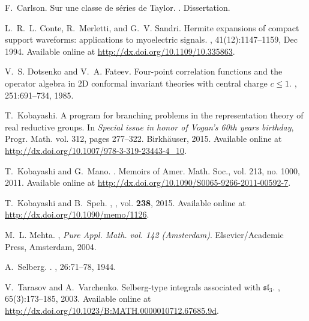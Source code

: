 \begin{thebibliography}{CMS94}

F.~Carlson.
\newblock Sur une classe de s\'eries de {T}aylor.
.
\newblock Dissertation.

L.~R.~L. Conte, R.~Merletti, and G.~V. Sandri.
\newblock Hermite expansions of compact support waveforms: applications to
  myoelectric signals.
, 41(12):1147--1159, Dec 1994.
\newblock Available online at \url{http://dx.doi.org/10.1109/10.335863}.

V.~S. Dotsenko and V.~A. Fateev.
\newblock Four-point correlation functions and the operator algebra in 2{D}
  conformal invariant theories with central charge $c\leq 1$.
, 251:691--734, 1985.

T.~Kobayashi.
\newblock A program for branching problems in the representation theory of real
  reductive groups.
\newblock In {\em {\normalfont Special issue in honor of Vogan's 60th years
  birthday}}, Progr. Math. vol. 312, pages 277--322. Birkh{\"a}user, 2015.
\newblock Available online at
  \url{http://dx.doi.org/10.1007/978-3-319-23443-4_10}.

T.~Kobayashi and G.~Mano.
.
\newblock Memoirs of Amer. Math. Soc., vol. 213, no. 1000, 2011.
\newblock Available online at
  \url{http://dx.doi.org/10.1090/S0065-9266-2011-00592-7}.

T.~Kobayashi and B.~Speh.
, 
, vol. \textbf{238}, 2015.
\newblock Available online at \url{http://dx.doi.org/10.1090/memo/1126}.

M.~L. Mehta.
, {\em {\normalfont Pure Appl.
  Math. vol. 142 ({A}msterdam})}.
\newblock Elsevier/{A}cademic {P}ress, {A}msterdam, 2004.

A.~Selberg.
.
, 26:71--78, 1944.

V.~Tarasov and A.~Varchenko.
\newblock Selberg-type integrals associated with $\mathfrak{sl}_3$.
, 65(3):173--185, 2003.
\newblock Available online at
  \url{http://dx.doi.org/10.1023/B:MATH.0000010712.67685.9d}.


\end{thebibliography}
